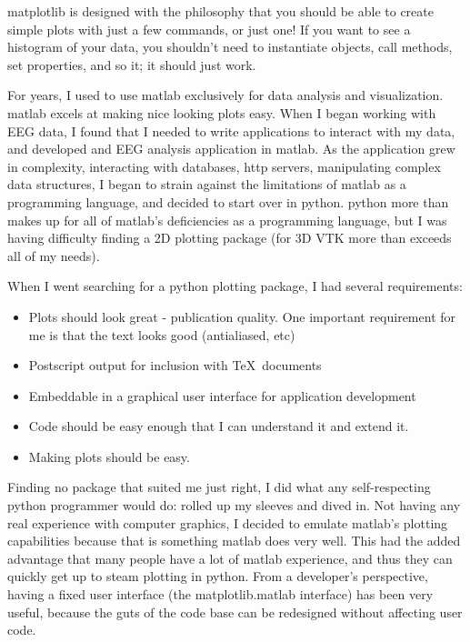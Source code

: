\documentclass[twoside]{book}
\begin{document}
matplotlib is designed with the philosophy that you should be able to
create simple plots with just a few commands, or just one!  If you
want to see a histogram of your data, you shouldn't need to
instantiate objects, call methods, set properties, and so it; it
should just work.  

For years, I used to use matlab exclusively for data analysis and
visualization.  matlab excels at making nice looking plots easy.  When
I began working with EEG data, I found that I needed to write
applications to interact with my data, and developed and EEG analysis
application in matlab.  As the application grew in complexity,
interacting with databases, http servers, manipulating complex data
structures, I began to strain against the limitations of matlab as a
programming language, and decided to start over in python.  python
more than makes up for all of matlab's deficiencies as a programming
language, but I was having difficulty finding a 2D plotting package
(for 3D VTK more than exceeds all of my needs).

When I went searching for a python plotting package, I had several
requirements:

\begin{itemize}
  
\item Plots should look great - publication quality.  One important
  requirement for me is that the text looks good (antialiased, etc)

\item Postscript output for inclusion with \TeX\ documents
  
\item Embeddable in a graphical user interface for application
  development
  
\item Code should be easy enough that I can understand it and extend
  it.

\item Making plots should be easy.

\end{itemize}

\noindent Finding no package that suited me just right, I did what any
self-respecting python programmer would do: rolled up my sleeves and
dived in.  Not having any real experience with computer graphics, I
decided to emulate matlab's plotting capabilities because that is
something matlab does very well.  This had the added advantage that
many people have a lot of matlab experience, and thus they can quickly
get up to steam plotting in python.  From a developer's perspective,
having a fixed user interface (the matplotlib.matlab interface) has
been very useful, because the guts of the code base can be redesigned
without affecting user code.
\end{document}
